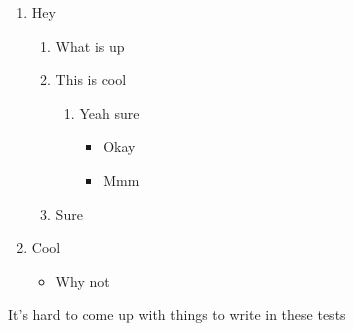 \documentclass[10pt]{extarticle}
\begin{document}
\begin{enumerate}
\item Hey
\begin{enumerate}
\item What is up
\item This is cool
\begin{enumerate}
\item Yeah sure
\begin{itemize}
\item Okay
\item Mmm
\end{itemize}
\end{enumerate}
\item Sure
\end{enumerate}
\item Cool
\begin{itemize}
\item Why not
\end{itemize}
\end{enumerate}

It's hard to come up with things to write in these tests

\end{document}
